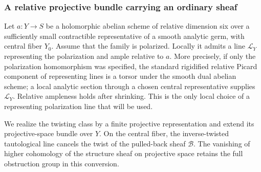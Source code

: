 \documentclass[11pt]{article}
\numberwithin{equation}{section}
\begin{document}
\subsubsection{A relative projective bundle carrying an ordinary sheaf}

Let \(a:Y\to S\) be a holomorphic abelian scheme of relative dimension
six over a sufficiently small contractible representative of a smooth
analytic germ, with central fiber \(Y_0\).  Assume that the family is
polarized.  Locally it admits a line \(\mathcal L_Y\) representing the
polarization and ample relative to \(a\).  More precisely, if only the
polarization homomorphism was specified, the standard rigidified
relative Picard component of representing lines is a torsor under the
smooth dual abelian scheme; a local analytic section through a chosen
central representative supplies \(\mathcal L_Y\).  Relative ampleness
holds after shrinking.  This is the only local choice of a representing
polarization line that will be used.

We realize the twisting class by a finite projective representation
and extend its projective-space bundle over \(Y\).  On the central
fiber, the inverse-twisted tautological line cancels the twist of the
pulled-back sheaf \(\mathcal B\).  The vanishing of higher cohomology
of the structure sheaf on projective space retains the full obstruction
group in this conversion.
\end{document}
